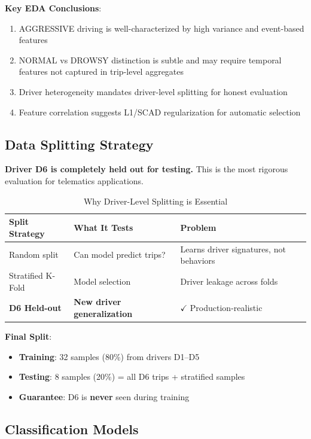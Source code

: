 \documentclass[11pt,a4paper]{article}
\begin{document}
\textbf{Key EDA Conclusions}:
\begin{enumerate}[leftmargin=*]
    \item AGGRESSIVE driving is well-characterized by high variance and event-based features
    \item NORMAL vs DROWSY distinction is subtle and may require temporal features not captured in trip-level aggregates
    \item Driver heterogeneity mandates driver-level splitting for honest evaluation
    \item Feature correlation suggests L1/SCAD regularization for automatic selection
\end{enumerate}

\subsection{Data Splitting Strategy}

\textbf{Driver D6 is completely held out for testing.} This is the most rigorous evaluation for telematics applications.

\begin{table}[H]
\centering
\caption{Why Driver-Level Splitting is Essential}
\begin{tabular}{p{3.5cm}p{4.5cm}p{4.5cm}}
\toprule
\textbf{Split Strategy} & \textbf{What It Tests} & \textbf{Problem} \\
\midrule
Random split & Can model predict trips? & Learns driver signatures, not behaviors \\
Stratified K-Fold & Model selection & Driver leakage across folds \\
\textbf{D6 Held-out} & \textbf{New driver generalization} & $\checkmark$ Production-realistic \\
\bottomrule
\end{tabular}
\end{table}

\textbf{Final Split}:
\begin{itemize}[leftmargin=*]
    \item \textbf{Training}: 32 samples (80\%) from drivers D1--D5
    \item \textbf{Testing}: 8 samples (20\%) = all D6 trips + stratified samples
    \item \textbf{Guarantee}: D6 is \textbf{never} seen during training
\end{itemize}

\subsection{Classification Models}
\end{document}

